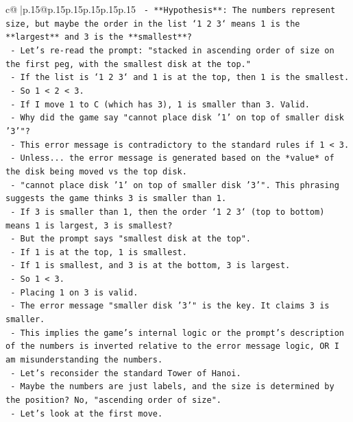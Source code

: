 \documentclass{article}
\begin{document}
{\begin{supertabular}{c@{$\;$}|p{.15\linewidth}@{}p{.15\linewidth}p{.15\linewidth}p{.15\linewidth}p{.15\linewidth}p{.15\linewidth}}
{{{\texttt{  {-} **Hypothesis**: The numbers represent size, but maybe the order in the list `1 2 3` means 1 is the **largest** and 3 is the **smallest**?} \\
\texttt{  {-} Let's re{-}read the prompt: "stacked in ascending order of size on the first peg, with the smallest disk at the top."} \\
\texttt{  {-} If the list is `1 2 3` and 1 is at the top, then 1 is the smallest.} \\
\texttt{  {-} So 1 < 2 < 3.} \\
\texttt{  {-} If I move 1 to C (which has 3), 1 is smaller than 3. Valid.} \\
\texttt{  {-} Why did the game say "cannot place disk '1' on top of smaller disk '3'"?} \\
\texttt{  {-} This error message is contradictory to the standard rules if 1 < 3.} \\
\texttt{  {-} Unless... the error message is generated based on the *value* of the disk being moved vs the top disk.} \\
\texttt{  {-} "cannot place disk '1' on top of smaller disk '3'". This phrasing suggests the game thinks 3 is smaller than 1.} \\
\texttt{  {-} If 3 is smaller than 1, then the order `1 2 3` (top to bottom) means 1 is largest, 3 is smallest?} \\
\texttt{  {-} But the prompt says "smallest disk at the top".} \\
\texttt{  {-} If 1 is at the top, 1 is smallest.} \\
\texttt{  {-} If 1 is smallest, and 3 is at the bottom, 3 is largest.} \\
\texttt{  {-} So 1 < 3.} \\
\texttt{  {-} Placing 1 on 3 is valid.} \\
\texttt{  {-} The error message "smaller disk '3'" is the key. It claims 3 is smaller.} \\
\texttt{  {-} This implies the game's internal logic or the prompt's description of the numbers is inverted relative to the error message logic, OR I am misunderstanding the numbers.} \\
\texttt{  {-} Let's reconsider the standard Tower of Hanoi.} \\
\texttt{  {-} Maybe the numbers are just labels, and the size is determined by the position? No, "ascending order of size".} \\
\texttt{  {-} Let's look at the first move.} \\
}}}
\end{supertabular}}
\end{document}
